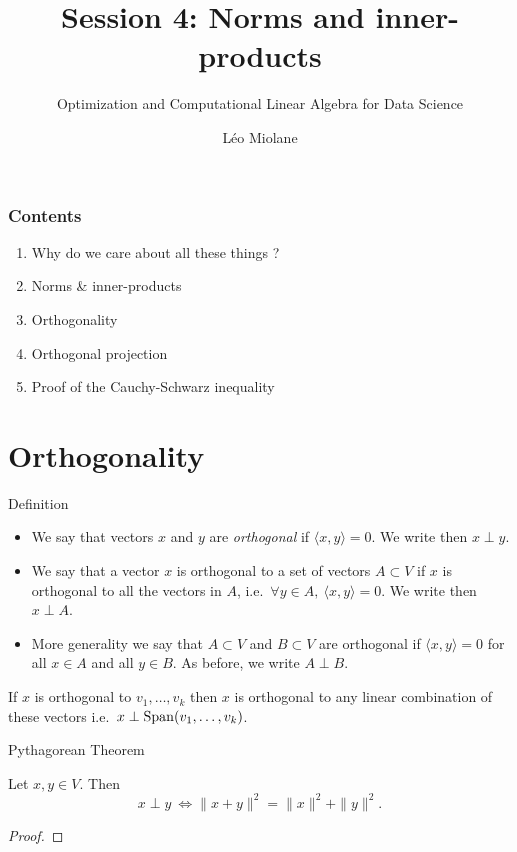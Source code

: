 \documentclass{beamer}
\title{Session 4: Norms and inner-products}
\subtitle{Optimization and Computational Linear Algebra for Data Science}
\author{Léo Miolane}
\date{}
\begin{document}
\setcounter{showProgressBar}{0}
\setcounter{showSlideNumbers}{0}

\frame{\titlepage}

\begin{frame}
	\frametitle{Contents}
	\begin{enumerate}
		\item Why do we care about all these things ? 
		\item Norms \& inner-products
		\item Orthogonality
		\item Orthogonal projection
		\item Proof of the Cauchy-Schwarz inequality
	\end{enumerate}
\end{frame}


\setcounter{framenumber}{0}
\setcounter{showSlideNumbers}{1}

\section{Orthogonality}

\begin{frame}{Definition}
\begin{definition}[Orthogonality]
	\begin{itemize}
		\item We say that vectors $x$ and $y$ are \emph{orthogonal} if $\langle x,y \rangle = 0$. We write then $x \perp y$.
		\item We say that a vector $x$ is orthogonal to a set of vectors $A \subset V$ if $x$ is orthogonal to all the vectors in $A$, i.e.\ $\forall y \in A, \ \langle x,y\rangle = 0$. We write then $x \perp A$.
		\item More generality we say that $A \subset V$ and $B \subset V$ are orthogonal if $\langle x,y \rangle = 0$ for all $x \in A$ and all $y \in B$. As before, we write $A \perp B$.
	\end{itemize}
\end{definition}


\begin{exercise}
	If $x$ is orthogonal to $v_1, \dots, v_k$ then $x$ is orthogonal to any linear combination of these vectors i.e.\ $x \perp {{\rm Span}}(v_1, \dots, v_k)$.
\end{exercise}
\end{frame}

\begin{frame}{Pythagorean Theorem}
	\grid

\begin{theorem}
	Let $x,y \in V$. Then
	$$
	x \perp y \ \Longleftrightarrow \|x+y\|^2 = \|x\|^2 + \|y\|^2.
	$$
\end{theorem}
\begin{proof}
	\vfill
	\vspace{4cm}
\end{proof}
\end{frame}
\end{document}
